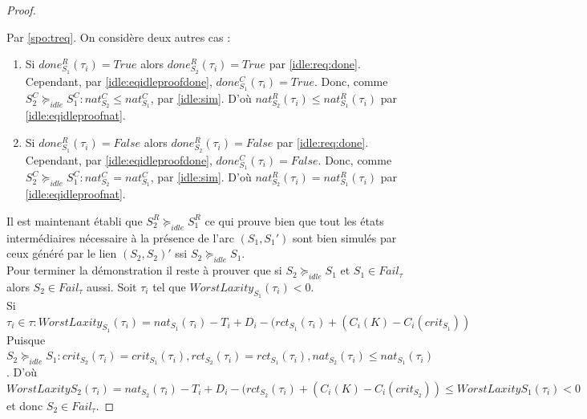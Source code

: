 \documentclass[12pt,a4paper,oneside]{book}
\theoremstyle{break}
\theoremstyle{breakplain}
\begin{document}
\begin{proof}
\begin{enumerate}
\end{enumerate}

Par \autoref{spo:treq}. On considère deux autres cas :
\begin{enumerate}[label=(\alph*)]
\item Si $done_{S_1}^R(\tau_i) = True$ alors $done_{S_2}^R(\tau_i) = True$ par \autoref{idle:req:done}. Cependant, par \autoref{idle:eqidleproofdone}, $done_{S_1}^C(\tau_i) = True$. Donc, comme $S^C_2 \succeq_{idle} S^C_1 : nat_{S_2}^C \leq nat_{S_1}^C$, par \autoref{idle:sim}. D'où $nat_{S_2}^R(\tau_i) \leq nat_{S_1}^R(\tau_i)$ par \autoref{idle:eqidleproofnat}.

\item Si $done_{S_1}^R(\tau_i) = False$ alors $done_{S_2}^R(\tau_i) = False$ par \autoref{idle:req:done}. Cependant, par \autoref{idle:eqidleproofdone}, $done_{S_1}^C(\tau_i) = False$. Donc, comme $S^C_2 \succeq_{idle} S^C_1 : nat_{S_2}^C = nat_{S_1}^C$, par \autoref{idle:sim}. D'où $nat_{S_2}^R(\tau_i) = nat_{S_1}^R(\tau_i)$ par \autoref{idle:eqidleproofnat}.
\end{enumerate}


Il est maintenant établi que $S^R_2 \succeq_{idle} S^R_1$ ce qui prouve bien que tout les états intermédiaires nécessaire à la présence de l'arc $(S_1, S_1')$ sont bien simulés par ceux généré par le lien $(S_2, S_2)'$ ssi $S_2 \succeq_{idle} S_1$.\\

Pour terminer la démonstration il reste à prouver que si $S_2 \succeq_{idle} S_1$ et $S_1 \in Fail_\tau$ alors $S_2 \in Fail_\tau$ aussi.  Soit $\tau_i$ tel que  $WorstLaxity_{S_1}(\tau_i) < 0$.\\

Si $\tau_i \in \tau : WorstLaxity_{S_1}(\tau_i) = nat_{S_1}(\tau_i) -T_i + D_i - (rct_{S_1}(\tau_i) + (C_i(K)-C_i(crit_{S_1}))$\\
Puisque $S_2 \succeq_{idle} S_1 : crit_{S_2}(\tau_i) = crit_{S_1}(\tau_i),  rct_{S_2}(\tau_i) = rct_{S_1}(\tau_i), nat_{S_2}(\tau_i) \leq nat_{S_1}(\tau_i)$. D'où $WorstLaxity{S_2}(\tau_i) = nat_{S_2}(\tau_i) -T_i + D_i - (rct_{S_2}(\tau_i) + (C_i(K)-C_i(crit_{S_2})) \leq WorstLaxity{S_1}(\tau_i) < 0$ et donc $S_2 \in Fail_\tau$.

\end{proof}
\end{document}
